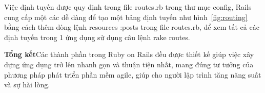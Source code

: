 Việc định tuyến được quy định trong file routes.rb trong thư mục config, Rails cung cấp một các dễ dàng để tạo một bảng định tuyến như hình~\ref{fig:routing} bằng cách thêm dòng lệnh resources :posts trong file routes.rb, để xem tất cả các định tuyến trong 1 ứng dụng sử dụng câu lệnh rake routes.
\newline

{\bf Tổng kết}\newline Các thành phần trong Ruby on Rails đều được thiết kế giúp việc xây dựng ứng dụng trở lên nhanh gọn và thuận tiện nhất, mang đúng tư tưởng của phương pháp phát triển phần mềm agile, giúp cho người lập trình tăng năng suất và sự hài lòng.

